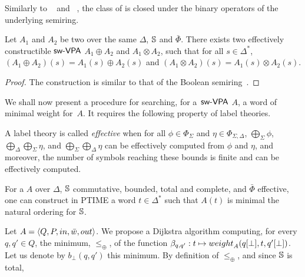 \medskip\noindent
Similarly to \VPA~\cite{AlurMadhusudan09nested}
and \SVPA~\cite{dAntonyAlur14SVPDA},
the class of \SWVPA is closed under the binary operators of the underlying semiring.
%
\begin{proposition}\label{prop:SWVPA-product}
Let $A_1$ and $A_2$ be two \SWVPA
over the same $\Delta$, $\mathbb{S}$ and $\bar\Phi$.
There exists two effectively constructible $\textsf{sw-VPA}$
$A_1 \oplus A_2$ and $A_1 \otimes A_2$,
such that for all $s \in \Delta^*$,
$(A_1 \oplus A_2)(s) = A_1(s) \oplus A_2(s)$ and
$(A_1 \otimes A_2)(s) = A_1(s) \otimes A_2(s)$.
\end{proposition}
%
\begin{proof}
The construction is similar
to that of the Boolean semiring~\cite{dAntonyAlur14SVPDA}.
\end{proof}
\noindent
We shall now present a procedure for searching, for a~$\textsf{sw-VPA}$ $A$,
a word %
of minimal weight for~$A$.
It requires the following property of label theories.
%
\begin{definition}\label{def:effective}
A label theory is called \emph{effective} when
for all $\phi \in \Phi_\Sigma$ and $\eta \in \Phi_{\Sigma, \Delta}$,
$\bigoplus_{\Sigma} \phi$,
$\bigoplus_{\Delta}\bigoplus_{\Sigma} \eta$, and
$\bigoplus_{\Sigma}\bigoplus_{\Delta} \eta$
can be effectively computed from $\phi$ and $\eta$,
and moreover, the number of symbols reaching these bounds is finite
and can be effectively computed.
\end{definition}
%
\begin{proposition}\label{th:best-search}
For a \SWVPA $A$
over $\Delta$,
$\mathbb{S}$ commutative, bounded, total and complete, %
and $\bar\Phi$ effective, %
one can construct in PTIME a word $t \in \Delta^*$
such that $A(t)$ is minimal \wrt the natural ordering for $\mathbb{S}$.
\end{proposition}
%
Let $A = \< Q, P, \init, \bar\wei, \final >$.
%
We propose a Dijkstra algorithm computing,
for every $q, q' \in Q$,
the minimum, \wrt $\leq_\oplus$, of the function
$\beta_{q, q'} : t \mapsto \weight_A(\config{q}{\bot}, t, \config{q'}{\bot})$.
Let us denote by $b_\bot(q, q')$ this minimum.
By definition of $\leq_\oplus$, and since $\mathbb{S}$ is total,
